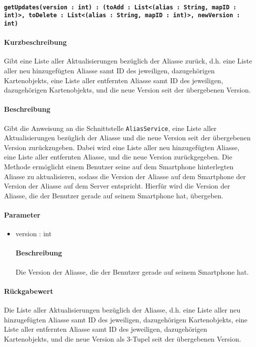 \paragraph{\texttt{getUpdates(version : int) : (toAdd : List<(alias : String, mapID : int)>, toDelete : List<(alias : String, mapID : int)>, newVersion : int)}}%
\paragraph*{Kurzbeschreibung}
Gibt eine Liste aller Aktualisierungen bezüglich der Aliasse zurück, d.h. eine Liste aller neu hinzugefügten Aliasse samt ID des jeweiligen, dazugehörigen Kartenobjekts, eine Liste aller entfernten Aliasse samt ID des jeweiligen, dazugehörigen Kartenobjekts, und die neue Version seit der übergebenen Version.
\paragraph*{Beschreibung}
Gibt die Anweisung an die Schnittstelle \texttt{AliasService}, eine Liste aller Aktualisierungen bezüglich der Aliasse und die neue Version seit der übergebenen Version zurückzugeben. 
Dabei wird eine Liste aller neu hinzugefügten Aliasse, eine Liste aller entfernten Aliasse, und die neue Version zurückgegeben.
Die Methode ermöglicht einem Benutzer seine auf dem Smartphone hinterlegten Aliasse zu aktualisieren, sodass die Version der Aliasse auf dem Smartphone der Version der Aliasse auf dem Server entspricht.
Hierfür wird die Version der Aliasse, die der Benutzer gerade auf seinem Smartphone hat, übergeben.
\paragraph*{Parameter}
\begin{itemize}
    \item version : int
    		\paragraph*{Beschreibung}
    		Die Version der Aliasse, die der Benutzer gerade auf seinem Smartphone hat.
\end{itemize}
\paragraph*{Rückgabewert}
Die Liste aller Aktualisierungen bezüglich der Aliasse, d.h. eine Liste aller neu hinzugefügten Aliasse samt ID des jeweiligen, dazugehörigen Kartenobjekts, eine Liste aller entfernten Aliasse samt ID des jeweiligen, dazugehörigen Kartenobjekts, und die neue Version als 3-Tupel seit der übergebenen Version.
